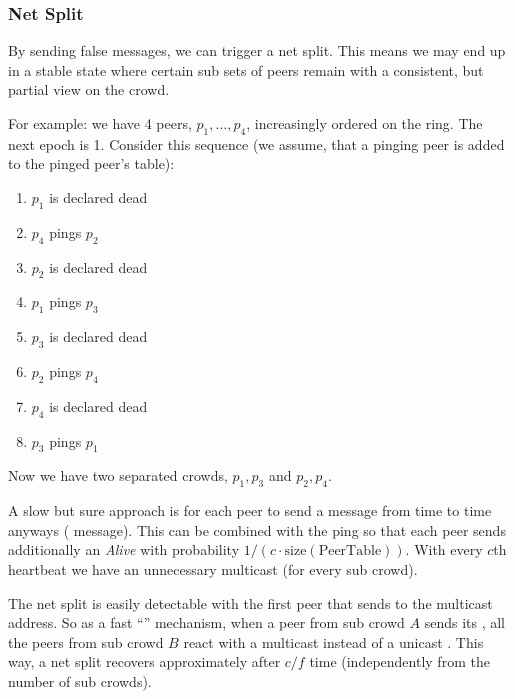 \subsubsection{Net Split}
By sending false  messages, we can trigger a net split.
This means we may end up in a stable state where certain sub sets of peers remain with a consistent, but partial view on the crowd.

For example: we have 4 peers, $p_1, \dots, p_4$, increasingly ordered on the ring.
The next epoch is 1.
Consider this sequence (we assume, that a pinging peer is added to the pinged peer's table):
\begin{enumerate}
	\item $p_1$ is declared dead
	\item $p_4$ pings $p_2$
	\item $p_2$ is declared dead
	\item $p_1$ pings $p_3$
	\item $p_3$ is declared dead
	\item $p_2$ pings $p_4$
	\item $p_4$ is declared dead
	\item $p_3$ pings $p_1$  
\end{enumerate}
Now we have two separated crowds, $p_1, p_3$ and $p_2, p_4$.

A slow but sure approach is for each peer to send a  message from time to time anyways ( message).
This can be combined with the ping so that each peer sends additionally an \emph{Alive} with probability $1/(c\cdot \text{size}(\text{PeerTable}))$.
With every $c$th heartbeat we have an unnecessary multicast  (for every sub crowd).

The net split is easily detectable with the first peer that sends to the multicast address.
So as a fast ``'' mechanism, when a peer from sub crowd $A$ sends its , all the peers from sub crowd $B$ react with a multicast  instead of a unicast .
This way, a net split recovers approximately after $c/f$ time (independently from the number of sub crowds).
